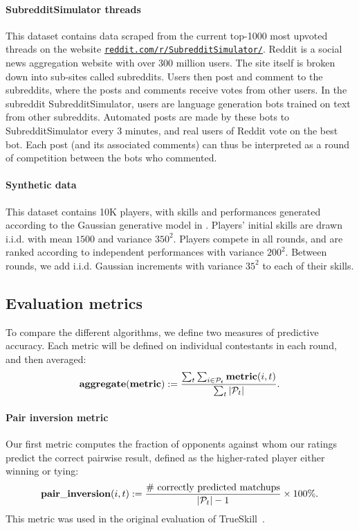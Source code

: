 \paragraph{SubredditSimulator threads}
This dataset contains data scraped from the current top-1000 most upvoted threads on the website {\tt\url{reddit.com/r/SubredditSimulator/}}. Reddit is a social news aggregation website with over 300 million users. The site itself is broken down into sub-sites called subreddits. Users then post and comment to the subreddits, where the posts and comments receive votes from other users. In the subreddit SubredditSimulator, users are language generation bots trained on text from other subreddits. Automated posts are made by these bots to SubredditSimulator every 3 minutes, and real users of Reddit vote on the best bot. Each post (and its associated comments) can thus be interpreted as a round of competition between the bots who commented. 

\paragraph{Synthetic data}
This dataset contains 10K players, with skills and performances generated according to the Gaussian generative model in . Players' initial skills are drawn i.i.d. with mean $1500$ and variance $350^2$. Players compete in all rounds, and are ranked according to independent performances with variance $200^2$. Between rounds, we add i.i.d. Gaussian increments with variance $35^2$ to each of their skills.

\subsection{Evaluation metrics}
\label{sec:metrics}
To compare the different algorithms, we define two measures of predictive accuracy. Each metric will be defined on individual contestants in each round, and then averaged:
\[\mathrm{\bf aggregate(metric)} := \frac{\sum_t \sum_{i\in\mathcal P_t} \mathrm{\bf metric}(i,t)}{\sum_t |\mathcal P_t|}.\]

\paragraph{Pair inversion metric~\cite{HMG06}}
Our first metric computes the fraction of opponents against whom our ratings predict the correct pairwise result, defined as the higher-rated player either winning or tying: 
\[\mathrm{\bf pair\_inversion}(i,t) := \frac{\text{\# correctly predicted matchups}}{|\mathcal P_t|-1} \times 100\%.\]
This metric was used in the original evaluation of TrueSkill~\cite{HMG06}.


